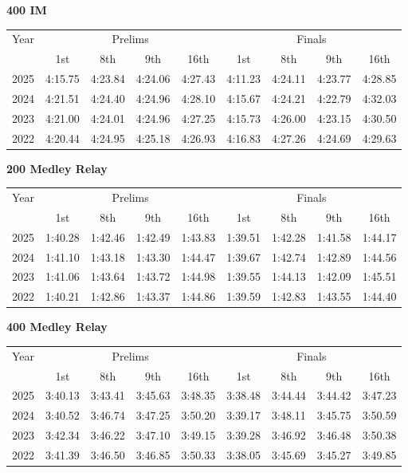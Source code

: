 \textbf{400 IM}

\begin{flushleft}
\begin{tabular}{|c|c|c|c|c|c|c|c|c|}
\hline
Year & \multicolumn{4}{c|}{Prelims} & \multicolumn{4}{c|}{Finals} \\
\cline{2-9}
& 1st & 8th & 9th & 16th & 1st & 8th & 9th & 16th \\
\hline
2025 & 4:15.75 & 4:23.84 & 4:24.06 & 4:27.43 & 4:11.23 & 4:24.11 & 4:23.77 & 4:28.85 \\
2024 & 4:21.51 & 4:24.40 & 4:24.96 & 4:28.10 & 4:15.67 & 4:24.21 & 4:22.79 & 4:32.03 \\
2023 & 4:21.00 & 4:24.01 & 4:24.96 & 4:27.25 & 4:15.73 & 4:26.00 & 4:23.15 & 4:30.50 \\
2022 & 4:20.44 & 4:24.95 & 4:25.18 & 4:26.93 & 4:16.83 & 4:27.26 & 4:24.69 & 4:29.63 \\
\hline
\end{tabular}
\end{flushleft}

\textbf{200 Medley Relay}

\begin{flushleft}
\begin{tabular}{|c|c|c|c|c|c|c|c|c|}
\hline
Year & \multicolumn{4}{c|}{Prelims} & \multicolumn{4}{c|}{Finals} \\
\cline{2-9}
& 1st & 8th & 9th & 16th & 1st & 8th & 9th & 16th \\
\hline
2025 & 1:40.28 & 1:42.46 & 1:42.49 & 1:43.83 & 1:39.51 & 1:42.28 & 1:41.58 & 1:44.17 \\
2024 & 1:41.10 & 1:43.18 & 1:43.30 & 1:44.47 & 1:39.67 & 1:42.74 & 1:42.89 & 1:44.56 \\
2023 & 1:41.06 & 1:43.64 & 1:43.72 & 1:44.98 & 1:39.55 & 1:44.13 & 1:42.09 & 1:45.51 \\
2022 & 1:40.21 & 1:42.86 & 1:43.37 & 1:44.86 & 1:39.59 & 1:42.83 & 1:43.55 & 1:44.40 \\
\hline
\end{tabular}
\end{flushleft}

\textbf{400 Medley Relay}

\begin{flushleft}
\begin{tabular}{|c|c|c|c|c|c|c|c|c|}
\hline
Year & \multicolumn{4}{c|}{Prelims} & \multicolumn{4}{c|}{Finals} \\
\cline{2-9}
& 1st & 8th & 9th & 16th & 1st & 8th & 9th & 16th \\
\hline
2025 & 3:40.13 & 3:43.41 & 3:45.63 & 3:48.35 & 3:38.48 & 3:44.44 & 3:44.42 & 3:47.23 \\
2024 & 3:40.52 & 3:46.74 & 3:47.25 & 3:50.20 & 3:39.17 & 3:48.11 & 3:45.75 & 3:50.59 \\
2023 & 3:42.34 & 3:46.22 & 3:47.10 & 3:49.15 & 3:39.28 & 3:46.92 & 3:46.48 & 3:50.38 \\
2022 & 3:41.39 & 3:46.50 & 3:46.85 & 3:50.33 & 3:38.05 & 3:45.69 & 3:45.27 & 3:49.85 \\
\hline
\end{tabular}
\end{flushleft}

